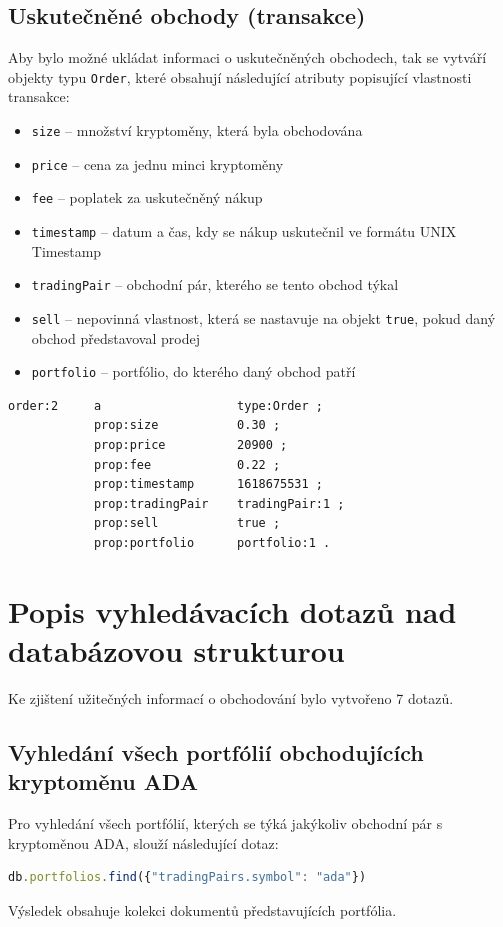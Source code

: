 \documentclass[12pt, a4paper]{article}
\let\oldsection\section
\renewcommand\section{\clearpage\oldsection}
\begin{document}
\subsection{Uskutečněné obchody (transakce)}
Aby bylo možné ukládat informaci o uskutečněných obchodech, tak se vytváří objekty typu \texttt{Order}, které obsahují následující atributy popisující vlastnosti transakce: 
\begin{itemize}
    \item \texttt{size} -- množství kryptoměny, která byla obchodována
    \item \texttt{price} -- cena za jednu minci kryptoměny
    \item \texttt{fee} -- poplatek za uskutečněný nákup
    \item \texttt{timestamp} -- datum a čas, kdy se nákup uskutečnil ve formátu UNIX Timestamp
    \item \texttt{tradingPair} -- obchodní pár, kterého se tento obchod týkal
    \item \texttt{sell} -- nepovinná vlastnost, která se nastavuje na objekt \texttt{true}, pokud daný obchod představoval prodej
    \item \texttt{portfolio} -- portfólio, do kterého daný obchod patří
\end{itemize}

\begin{lstlisting}
order:2     a                   type:Order ;
            prop:size           0.30 ;
            prop:price          20900 ;
            prop:fee            0.22 ;
            prop:timestamp      1618675531 ;
            prop:tradingPair    tradingPair:1 ;
            prop:sell           true ;
            prop:portfolio      portfolio:1 .
\end{lstlisting}

\section{Popis vyhledávacích dotazů nad databázovou strukturou}
Ke zjištení užitečných informací o obchodování bylo vytvořeno 7 dotazů.

\subsection{Vyhledání všech portfólií obchodujících kryptoměnu ADA}
Pro vyhledání všech portfólií, kterých se týká jakýkoliv obchodní pár s kryptoměnou ADA, slouží následující dotaz:

\begin{lstlisting}[language=JavaScript]
db.portfolios.find({"tradingPairs.symbol": "ada"})
\end{lstlisting}
Výsledek obsahuje kolekci dokumentů představujících portfólia.
\end{document}
